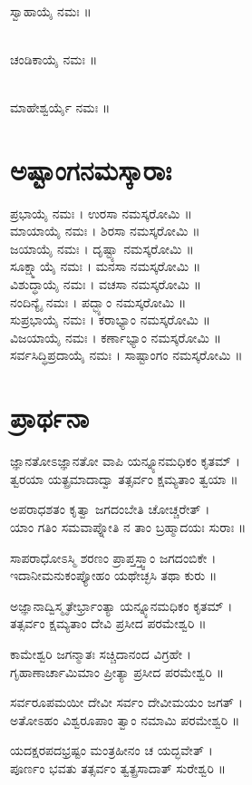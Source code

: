 \\
ಸ್ವಾಹಾಯೈ ನಮಃ ॥

\\
ಚಂಡಿಕಾಯೈ ನಮಃ ॥

\\
ಮಾಹೇಶ್ವರ್ಯೈ ನಮಃ ॥ 
\newpage
\section{ಅಷ್ಟಾಂಗನಮಸ್ಕಾರಾಃ}
ಪ್ರಭಾಯೈ ನಮಃ । ಉರಸಾ ನಮಸ್ಕರೋಮಿ ॥\\
ಮಾಯಾಯೈ ನಮಃ । ಶಿರಸಾ ನಮಸ್ಕರೋಮಿ ॥\\
ಜಯಾಯೈ ನಮಃ । ದೃಷ್ಟ್ಯಾ ನಮಸ್ಕರೋಮಿ ॥\\
ಸೂಕ್ಷ್ಮಾಯೈ ನಮಃ । ಮನಸಾ ನಮಸ್ಕರೋಮಿ ॥\\
ವಿಶುದ್ಧಾಯೈ ನಮಃ । ವಚಸಾ ನಮಸ್ಕರೋಮಿ ॥\\
ನಂದಿನ್ಯೈ ನಮಃ । ಪದ್ಭ್ಯಾಂ ನಮಸ್ಕರೋಮಿ ॥\\
ಸುಪ್ರಭಾಯೈ ನಮಃ । ಕರಾಭ್ಯಾಂ ನಮಸ್ಕರೋಮಿ ॥\\
ವಿಜಯಾಯೈ ನಮಃ । ಕರ್ಣಾಭ್ಯಾಂ ನಮಸ್ಕರೋಮಿ ॥\\
ಸರ್ವಸಿದ್ಧಿಪ್ರದಾಯೈ ನಮಃ । ಸಾಷ್ಟಾಂಗಂ ನಮಸ್ಕರೋಮಿ ॥
\section{ಪ್ರಾರ್ಥನಾ}
ಜ್ಞಾನತೋಽಜ್ಞಾನತೋ ವಾಪಿ ಯನ್ನ್ಯೂನಮಧಿಕಂ ಕೃತಮ್ ।\\
ತ್ವರಯಾ ಯತ್ಪ್ರಮಾದಾದ್ವಾ ತತ್ಸರ್ವಂ ಕ್ಷಮ್ಯತಾಂ ತ್ವಯಾ ॥

ಅಪರಾಧಶತಂ ಕೃತ್ವಾ ಜಗದಂಬೇತಿ ಚೋಚ್ಚರೇತ್ ।\\
ಯಾಂ ಗತಿಂ ಸಮವಾಪ್ನೋತಿ ನ ತಾಂ ಬ್ರಹ್ಮಾದಯಃ ಸುರಾಃ ॥

ಸಾಪರಾಧೋಽಸ್ಮಿ ಶರಣಂ ಪ್ರಾಪ್ತಸ್ತ್ವಾಂ ಜಗದಂಬಿಕೇ ।\\
ಇದಾನೀಮನುಕಂಪ್ಯೋಹಂ ಯಥೇಚ್ಛಸಿ ತಥಾ ಕುರು ॥

ಅಜ್ಞಾನಾದ್ವಿಸ್ಮೃತೇರ್ಭ್ರಾಂತ್ಯಾ ಯನ್ನ್ಯೂನಮಧಿಕಂ ಕೃತಮ್ ।\\
ತತ್ಸರ್ವಂ ಕ್ಷಮ್ಯತಾಂ ದೇವಿ ಪ್ರಸೀದ ಪರಮೇಶ್ವರಿ ॥

ಕಾಮೇಶ್ವರಿ ಜಗನ್ಮಾತಃ ಸಚ್ಚಿದಾನಂದ ವಿಗ್ರಹೇ ।\\
ಗೃಹಾಣಾರ್ಚಾಮಿಮಾಂ ಪ್ರೀತ್ಯಾ ಪ್ರಸೀದ ಪರಮೇಶ್ವರಿ ॥

ಸರ್ವರೂಪಮಯೀ ದೇವೀ ಸರ್ವಂ ದೇವೀಮಯಂ ಜಗತ್ ।\\
ಅತೋಽಹಂ ವಿಶ್ವರೂಪಾಂ ತ್ವಾಂ ನಮಾಮಿ ಪರಮೇಶ್ವರಿ ॥

ಯದಕ್ಷರಪದಭ್ರಷ್ಟಂ ಮಂತ್ರಹೀನಂ ಚ ಯದ್ಭವೇತ್ ।\\
ಪೂರ್ಣಂ ಭವತು ತತ್ಸರ್ವಂ ತ್ವತ್ಪ್ರಸಾದಾತ್ ಸುರೇಶ್ವರಿ ॥

